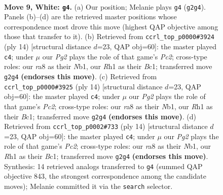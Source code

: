 \documentclass[11pt]{article}
\begin{document}
\begin{figure}[p]\centering
\begin{subfigure}{0.46\textwidth}\centering
\resizebox{\linewidth}{!}{%
\newchessgame
\chessboard[
  setfen={r1b1kbnr/p1ppqppp/8/2p1P3/7P/8/PPP1QPP1/RNB1KB1R w KQkq - 0 9},
  showmover=false,
  pgfstyle=straightmove, color=movearrow, markmove={g2-g4}
]}
\caption{}
\end{subfigure}\hfill
\begin{subfigure}{0.46\textwidth}\centering
\resizebox{\linewidth}{!}{%
\newchessgame
\chessboard[
  setfen={r1b1kb1r/p1ppqppp/2p5/3nP3/8/8/PPP1QPPP/RNB1KB1R w KQkq - 3 8},
  showmover=false,
  pgfstyle=straightmove, color=movearrow, markmove={c2-c4}
]}
\caption{}
\end{subfigure}
\\[4pt]
\begin{subfigure}{0.46\textwidth}\centering
\resizebox{\linewidth}{!}{%
\newchessgame
\chessboard[
  setfen={r1b1kb1r/p1ppqppp/2p5/3nP3/8/8/PPP1QPPP/RNB1KB1R w KQkq - 3 8},
  showmover=false,
  pgfstyle=straightmove, color=movearrow, markmove={c2-c4}
]}
\caption{}
\end{subfigure}\hfill
\begin{subfigure}{0.46\textwidth}\centering
\resizebox{\linewidth}{!}{%
\newchessgame
\chessboard[
  setfen={r1b1kb1r/p1ppqppp/2p5/3nP3/8/8/PPP1QPPP/RNB1KB1R w KQkq - 3 8},
  showmover=false,
  pgfstyle=straightmove, color=movearrow, markmove={c2-c4}
]}
\caption{}
\end{subfigure}
\caption{\textbf{Move 9, White: \texttt{g4}.} (a) Our position; Melanie plays \texttt{g4} (\texttt{g2g4}). Panels (b)--(d) are the retrieved master positions whose correspondence most drove this move (highest QAP objective among those that transfer to it). (b) Retrieved from \texttt{ccrl\_top\_p0000\#3924} (ply 14) [structural distance $d$=23, QAP obj=60]: the master played \texttt{c4}; under $\mu$ our \emph{Pg2} plays the role of that game's \emph{Pc2}; cross-type roles: our \emph{r}a8 as their \emph{N}b1, our \emph{R}h1 as their \emph{B}c1; transferred move \texttt{g2g4} \textbf{(endorses this move)}. (c) Retrieved from \texttt{ccrl\_top\_p0000\#3925} (ply 14) [structural distance $d$=23, QAP obj=60]: the master played \texttt{c4}; under $\mu$ our \emph{Pg2} plays the role of that game's \emph{Pc2}; cross-type roles: our \emph{r}a8 as their \emph{N}b1, our \emph{R}h1 as their \emph{B}c1; transferred move \texttt{g2g4} \textbf{(endorses this move)}. (d) Retrieved from \texttt{ccrl\_top\_p0002\#733} (ply 14) [structural distance $d$=23, QAP obj=60]: the master played \texttt{c4}; under $\mu$ our \emph{Pg2} plays the role of that game's \emph{Pc2}; cross-type roles: our \emph{r}a8 as their \emph{N}b1, our \emph{R}h1 as their \emph{B}c1; transferred move \texttt{g2g4} \textbf{(endorses this move)}. Synthesis: 14 retrieved analogs transferred to \texttt{g4} (summed QAP objective 843, the strongest correspondence among the candidate moves); Melanie committed it via the \texttt{search} selector.}
\label{fig:thought-m16}
\end{figure}
\end{document}
